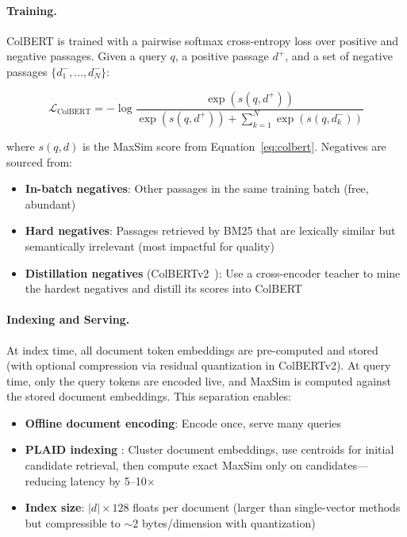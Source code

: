 \paragraph{Training.}
\label{training.-1}

ColBERT is trained with a pairwise softmax cross-entropy loss over positive and negative passages. Given a query $q$, a positive passage $d^+$, and a set of negative passages $\{d^-_1, \ldots, d^-_N\}$:

\begin{equation}
  \mathcal{L}_{\text{ColBERT}} = -\log \frac{\exp(s(q, d^+))}{\exp(s(q, d^+)) + \sum_{k=1}^{N} \exp(s(q, d^-_k))}
\end{equation}

where $s(q, d)$ is the MaxSim score from Equation~\ref{eq:colbert}. Negatives are sourced from:

\begin{itemize}
  \item \textbf{In-batch negatives}: Other passages in the same training batch (free, abundant)
  \item \textbf{Hard negatives}: Passages retrieved by BM25 that are lexically similar but semantically irrelevant (most impactful for quality)
  \item \textbf{Distillation negatives} (ColBERTv2~\cite{santhanam2022colbertv2}): Use a cross-encoder teacher to mine the hardest negatives and distill its scores into ColBERT
\end{itemize}

\paragraph{Indexing and Serving.}
\label{indexing-and-serving.}

At index time, all document token embeddings are pre-computed and stored (with optional compression via residual quantization in ColBERTv2). At query time, only the query tokens are encoded live, and MaxSim is computed against the stored document embeddings. This separation enables:

\begin{itemize}
  \item \textbf{Offline document encoding}: Encode once, serve many queries
  \item \textbf{PLAID indexing} \cite{santhanam2022colbertv2}: Cluster document embeddings, use centroids for initial candidate retrieval, then compute exact MaxSim only on candidates---reducing latency by 5--10$\times$
  \item \textbf{Index size}: $|d| \times 128$ floats per document (larger than single-vector methods but compressible to $\sim$2 bytes/dimension with quantization)
\end{itemize}

